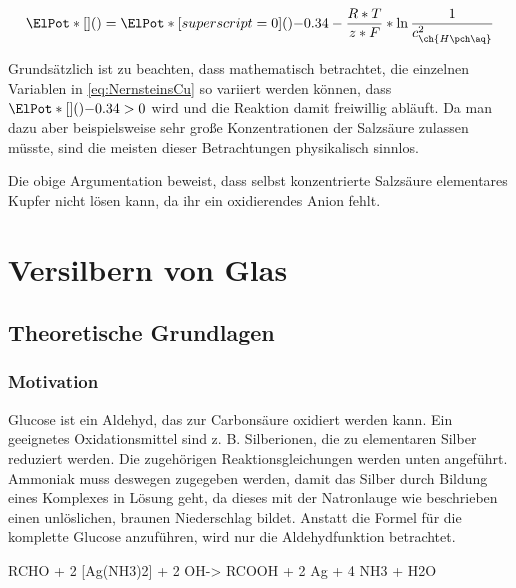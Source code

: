 \documentclass{article}
\begin{document}
      \begin{equation}
        \ElPot*[](){} = \ElPot*[superscript=0](){-0.34} - \frac{R*T}{z*F} * \ln {\frac{1}{c_{\ch{H\pch\aq}}^2}} \label{eq:NernstzweiCu}
      \end{equation}
      
      Grundsätzlich ist zu beachten, dass mathematisch betrachtet, die einzelnen Variablen in \eqref{eq:NernsteinsCu} so variiert werden können, dass $\ElPot*[](){-0.34} > 0$ wird und die Reaktion damit freiwillig abläuft. Da man dazu aber beispielsweise sehr große Konzentrationen der Salzsäure zulassen müsste, sind die meisten dieser Betrachtungen physikalisch sinnlos. 
      
      Die obige Argumentation beweist, dass selbst konzentrierte Salzsäure elementares Kupfer nicht lösen kann, da ihr ein oxidierendes Anion fehlt. 
      
  \pagebreak
  
  \section{Versilbern von Glas}
  
    \subsection{Theoretische Grundlagen}
      
      \subsubsection{Motivation}
      
        Glucose ist ein Aldehyd, das zur Carbonsäure oxidiert werden kann. Ein geeignetes Oxidationsmittel sind z. B.  Silberionen, die zu elementaren Silber reduziert werden. Die zugehörigen Reaktionsgleichungen werden unten angeführt. Ammoniak muss deswegen zugegeben werden, damit das Silber durch Bildung eines Komplexes in Lösung geht, da dieses mit der Natronlauge wie beschrieben einen unlöslichen, braunen Niederschlag bildet. Anstatt die Formel für die komplette Glucose anzuführen, wird nur die Aldehydfunktion betrachtet.
        
        \begin{reaction}
          RCHO\aq{} + 2 [Ag(NH3)2]\pch\aq{} + 2 OH\mch\aq -> RCOOH\aq{} + 2 Ag\sld{} + 4 NH3\aq{} + H2O \\
        \end{reaction}
        
\end{document}
